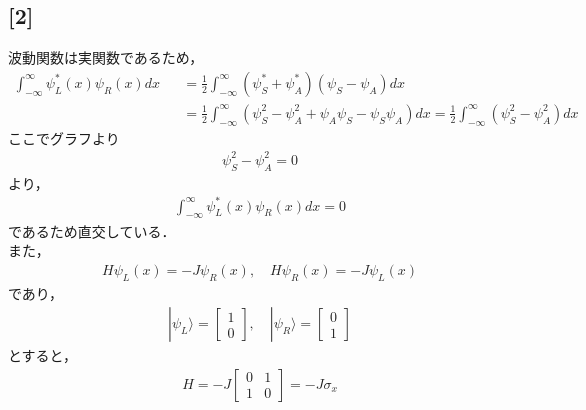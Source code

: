 \documentclass[12pt,dvipdfmx]{jsarticle}
\begin{document}
\subsection*{\large{[2]}}
波動関数は実関数であるため，
\begin{eqnarray}
  \int_{-\infty}^{\infty} \psi^{*}_L(x)\psi_R(x)dx &&= \frac{1}{2}\int_{-\infty}^{\infty} \left( \psi^{*}_S + \psi^{*}_A \right)\left( \psi_S - \psi_A \right)dx\\
  &&= \frac{1}{2}\int_{-\infty}^{\infty} \left( \psi_S^2 - \psi^2_A + \psi_A\psi_S - \psi_S \psi_A \right)dx = \frac{1}{2}\int_{-\infty}^{\infty} \left( \psi_S^2 - \psi^2_A\right)dx 
\end{eqnarray}
ここでグラフより
\begin{eqnarray}
  \psi_S^2 - \psi^2_A =0
\end{eqnarray}
より，
\begin{eqnarray}
  \int_{-\infty}^{\infty} \psi^{*}_L(x)\psi_R(x)dx=0
\end{eqnarray}
であるため直交している．\\
また，
\begin{eqnarray}
  H \psi_L(x) = -J\psi_R(x),\quad H \psi_R(x) = -J\psi_L(x)
\end{eqnarray}
であり，
\begin{eqnarray}
  |\psi_L\rangle=
  \begin{bmatrix}
    1\\
    0
  \end{bmatrix},\quad
  |\psi_R\rangle=
  \begin{bmatrix}
    0\\
    1
  \end{bmatrix}
\end{eqnarray}
とすると，
\begin{eqnarray}
  H = -J
  \begin{bmatrix}
    0 & 1\\
    1 & 0
  \end{bmatrix}
  =-J\sigma_x
\end{eqnarray}
\end{document}
